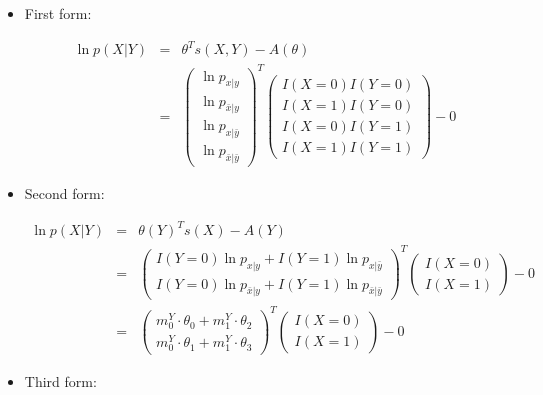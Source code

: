 \documentclass[11pt, oneside]{article}   	%
\numberwithin{figure}{section}
\numberwithin{equation}{section}
\numberwithin{table}{section}
\begin{document}
\begin{itemize}

\item First form:

\begin{eqnarray*}
\ln p(X|Y) &=& \theta^T s(X,Y) - A(\theta) \\
&=&
\begin{pmatrix}
\ln p_{x|y}\\
\ln p_{\bar{x}|y}\\
\ln p_{x|\bar{y}}\\
\ln p_{\bar{x}|\bar{y}}
\end{pmatrix}^T
\begin{pmatrix}
I(X=0)I(Y=0) \\
I(X=1)I(Y=0) \\
I(X=0)I(Y=1) \\
I(X=1)I(Y=1) 
\end{pmatrix}
- 0
\end{eqnarray*}

\item Second form:

\begin{eqnarray*}
\ln p(X|Y) &=& \theta(Y)^Ts(X) - A(Y) \\
&=&
\begin{pmatrix}
I(Y=0)\ln p_{x|y}  + I(Y=1)\ln p_{x|\bar{y}}\\
I(Y=0)\ln p_{\bar{x}|y}  + I(Y=1)\ln p_{\bar{x}|\bar{y}}
\end{pmatrix}^T
\begin{pmatrix}
I(X=0) \\
I(X=1)
\end{pmatrix}
- 0 \\
&=&
\begin{pmatrix}
m^Y_0\cdot\theta_0  + m^Y_1\cdot\theta_2\\
m^Y_0\cdot\theta_1  + m^Y_1\cdot\theta_3
\end{pmatrix}^T
\begin{pmatrix}
I(X=0) \\
I(X=1)
\end{pmatrix}
- 0 
\end{eqnarray*}

\item Third form:


\end{itemize}
\end{document}
